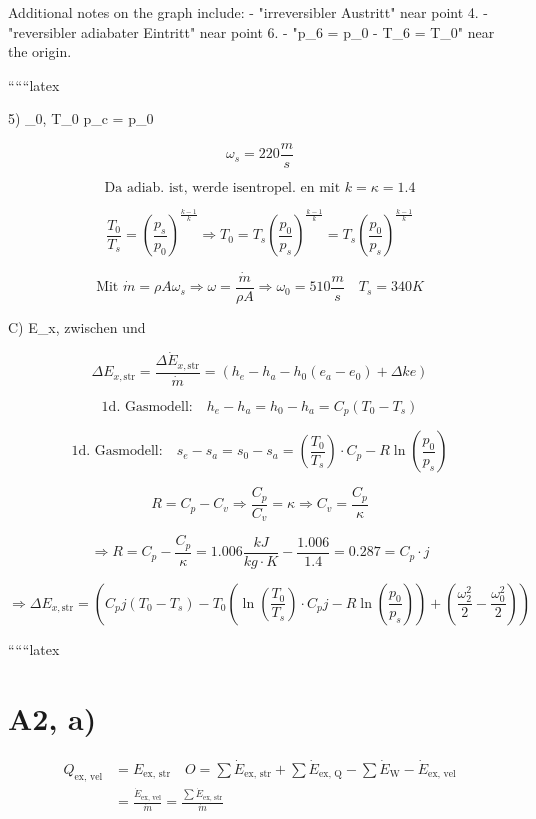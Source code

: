Additional notes on the graph include:
- "irreversibler Austritt" near point 4.
- "reversibler adiabater Eintritt" near point 6.
- "p_6 = p_0 - T_6 = T_0" near the origin.

``````latex


5) \quad \omega_0, T_0  \quad p_c = p_0

\[
\omega_s = 220 \frac{m}{s}
\]


\[
\text{Da adiab. ist, werde isentropel. en mit } k = \kappa = 1.4
\]

\[
\frac{T_0}{T_s} = \left( \frac{p_s}{p_0} \right)^{\frac{k-1}{k}} \Rightarrow T_0 = T_s \left( \frac{p_0}{p_s} \right)^{\frac{k-1}{k}} = T_s \left( \frac{p_0}{p_s} \right)^{\frac{k-1}{k}}
\]

\[
\text{Mit } \dot{m} = \rho A \omega_s \Rightarrow \omega = \frac{\dot{m}}{\rho A} \Rightarrow \omega_0 = 510 \frac{m}{s} \quad T_s = 340 K
\]

C) \quad \Delta E_{x, } \quad zwischen  \quad und 

\[
\Delta E_{x, \text{str}} = \frac{\Delta \dot{E}_{x, \text{str}}}{\dot{m}} = (h_e - h_a - h_0 (e_a - e_0) + \Delta ke)
\]

\[
\text{1d. Gasmodell:} \quad h_e - h_a = h_0 - h_a = C_p (T_0 - T_s)
\]

\[
\text{1d. Gasmodell:} \quad s_e - s_a = s_0 - s_a = \left( \frac{T_0}{T_s} \right) \cdot C_p - R \ln \left( \frac{p_0}{p_s} \right)
\]

\[
R = C_p - C_v \Rightarrow \frac{C_p}{C_v} = \kappa \Rightarrow C_v = \frac{C_p}{\kappa}
\]

\[
\Rightarrow R = C_p - \frac{C_p}{\kappa} = 1.006 \frac{kJ}{kg \cdot K} - \frac{1.006}{1.4} = 0.287 = C_p \cdot j
\]

\[
\Rightarrow \Delta E_{x, \text{str}} = \left( C_p j (T_0 - T_s) - T_0 \left( \ln \left( \frac{T_0}{T_s} \right) \cdot C_p j - R \ln \left( \frac{p_0}{p_s} \right) \right) + \left( \frac{\omega_2^2}{2} - \frac{\omega_0^2}{2} \right) \right)
\]

``````latex

\section*{A2, a)}

\begin{align*}
Q_{\text{ex, vel}} &= E_{\text{ex, str}} \quad O = \sum \dot{E}_{\text{ex, str}} + \sum \dot{E}_{\text{ex, Q}} - \sum \dot{E}_{\text{W}} - \dot{E}_{\text{ex, vel}} \\
&= \frac{\dot{E}_{\text{ex, vel}}}{\dot{m}} = \frac{\sum \dot{E}_{\text{ex, str}}}{\dot{m}}
\end{align*}

